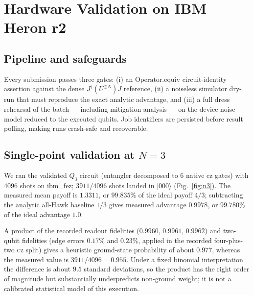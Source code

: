 \documentclass[conference]{IEEEtran}
\newcommand{\ket}[1]{\ensuremath{|#1\rangle}}
\begin{document}
\section{Hardware Validation on IBM Heron r2}\label{sec:hardware}

\subsection{Pipeline and safeguards}
Every submission passes three gates: (i) an $\mathrm{Operator.equiv}$
circuit-identity assertion against the dense
$J^\dagger (U^{\otimes N}) J$ reference, (ii) a noiseless simulator dry-run
that must reproduce the exact analytic advantage, and (iii) a full dress
rehearsal of the batch --- including mitigation analysis --- on the device
noise model reduced to the executed qubits. Job identifiers are persisted
before result polling, making runs crash-safe and recoverable.

\subsection{Single-point validation at $N=3$}
We ran the validated $Q_3$ circuit (entangler decomposed to 6 native cz gates)
with 4096 shots on ibm\_fez; $3911/4096$ shots landed in $\ket{000}$
(Fig.~\ref{fig:n3}). The measured mean payoff is $1.3311$, or
$99.835\%$ of the ideal payoff $4/3$; subtracting the analytic all-Hawk
baseline $1/3$ gives measured advantage $0.9978$, or $99.780\%$ of the ideal
advantage $1.0$.

A product of the recorded readout fidelities ($0.9960$, $0.9961$, $0.9962$)
and two-qubit fidelities (edge errors $0.17\%$ and $0.23\%$, applied in the
recorded four-plus-two \textsc{cz} split) gives a heuristic ground-state
probability of about $0.977$, whereas the measured value is
$3911/4096=0.955$. Under a fixed binomial interpretation the difference is
about $9.5$ standard deviations, so the product has the right order of
magnitude but substantially underpredicts non-ground weight; it is not a
calibrated statistical model of this execution.
\end{document}
